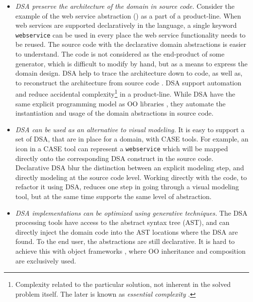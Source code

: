 \begin{itemize}
\item \textit{DSA preserve the architecture of the domain in source code.} Consider the example of the web service abstraction () as a part of a product-line. When web services are supported declaratively in the language, a single keyword \texttt{webservice} can be used in every place the web service functionality needs to be reused. The source code with the declarative domain abstractions is easier to understand. The code is not considered as the end-product of some generator, which is difficult to modify by hand, but as a means to express the domain design. DSA help to trace the architecture down to code, as well as, to reconstruct the architecture from source code \cite{sf.04}.
%
DSA support automation and reduce accidental complexity\footnote{Complexity related to the particular solution, not inherent in the solved problem itself. The later is known as \textit{essential complexity} \cite{brooks.87}.} in a product-line. While DSA have the same explicit programming model as OO libraries , they automate the instantiation and usage of the domain abstractions in source code.

\item \textit{DSA can be used as an alternative to visual modeling.} It is easy to support a set of DSA, that are in place for a domain, with CASE tools. For example, an icon in a CASE tool can represent a \texttt{webservice} which will be mapped directly onto the corresponding DSA construct in the source code. Declarative DSA blur the distinction between an explicit modeling step, and directly modeling at the source code level. 
Working directly with the code, to refactor it using DSA, reduces one step in going through a visual modeling tool, but at the same time supports the same level of abstraction. %

\item \textit{DSA implementations can be optimized using generative techniques.}  The DSA processing tools have access to the abstract syntax tree (AST), and can directly inject the domain code into the AST locations where the DSA are found. To the end user, the abstractions are still declarative. It is hard to achieve this with object frameworks \cite{dsl-pl.2000, batoryetal.00}, where OO inheritance and composition are exclusively used.

\end{itemize}

